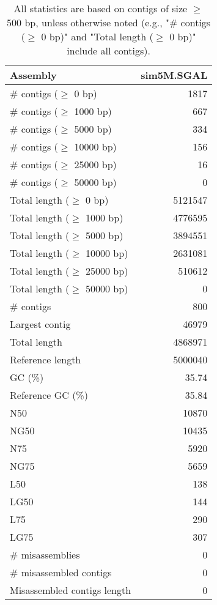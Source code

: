 \documentclass[12pt,a4paper]{article}
\begin{document}
\begin{table}[ht]
\begin{center}
\caption{All statistics are based on contigs of size $\geq$ 500 bp, unless otherwise noted (e.g., "\# contigs ($\geq$ 0 bp)" and "Total length ($\geq$ 0 bp)" include all contigs).}
\begin{tabular}{|l*{1}{|r}|}
\hline
Assembly & sim5M.SGAL \\ \hline
\# contigs ($\geq$ 0 bp) & 1817 \\ \hline
\# contigs ($\geq$ 1000 bp) & 667 \\ \hline
\# contigs ($\geq$ 5000 bp) & 334 \\ \hline
\# contigs ($\geq$ 10000 bp) & 156 \\ \hline
\# contigs ($\geq$ 25000 bp) & 16 \\ \hline
\# contigs ($\geq$ 50000 bp) & 0 \\ \hline
Total length ($\geq$ 0 bp) & 5121547 \\ \hline
Total length ($\geq$ 1000 bp) & 4776595 \\ \hline
Total length ($\geq$ 5000 bp) & 3894551 \\ \hline
Total length ($\geq$ 10000 bp) & 2631081 \\ \hline
Total length ($\geq$ 25000 bp) & 510612 \\ \hline
Total length ($\geq$ 50000 bp) & 0 \\ \hline
\# contigs & 800 \\ \hline
Largest contig & 46979 \\ \hline
Total length & 4868971 \\ \hline
Reference length & 5000040 \\ \hline
GC (\%) & 35.74 \\ \hline
Reference GC (\%) & 35.84 \\ \hline
N50 & 10870 \\ \hline
NG50 & 10435 \\ \hline
N75 & 5920 \\ \hline
NG75 & 5659 \\ \hline
L50 & 138 \\ \hline
LG50 & 144 \\ \hline
L75 & 290 \\ \hline
LG75 & 307 \\ \hline
\# misassemblies & 0 \\ \hline
\# misassembled contigs & 0 \\ \hline
Misassembled contigs length & 0 \\ \hline

\end{tabular}
\end{center}
\end{table}
\end{document}

